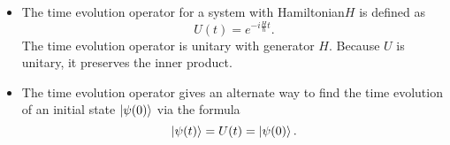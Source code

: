 \documentclass[11pt, a4paper]{article}
\newcommand{\Ham}{Hamiltonian\xspace}
\begin{document}
\begin{itemize}
    \item The time evolution operator for a system with \Ham $ H $ is defined as
    \begin{equation*}
        U(t) = e^{-i \frac{H}{\hbar}t}.
    \end{equation*}
    The time evolution operator is unitary with generator $ H $. Because $ U $ is unitary, it preserves the inner product.

    \item The time evolution operator gives an alternate way to find the time evolution of an initial state $ \ket{\psi(0)} $ via the formula
    \begin{equation*}
        \ket{\psi(t)} = U(t) = \ket{\psi(0)}.
    \end{equation*}
    
\end{itemize}
\end{document}
